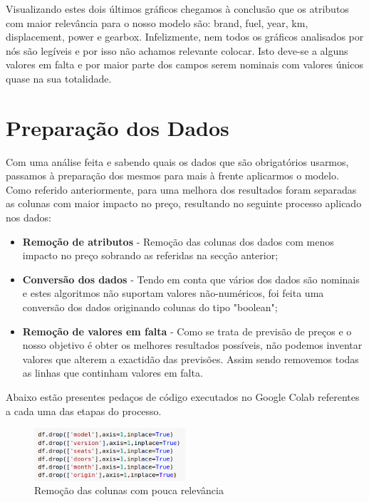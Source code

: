 \documentclass[a4paper]{report}
\begin{document}
Visualizando estes dois últimos gráficos chegamos à conclusão que os atributos com maior 
relevância para o nosso modelo são: brand, fuel, year, km, displacement, power e gearbox.
Infelizmente, nem todos os gráficos analisados por nós são legíveis
e por isso não achamos relevante colocar. Isto deve-se a alguns valores em falta e por
maior parte dos campos serem nominais com valores únicos quase na sua totalidade.

\section{Preparação dos Dados}

Com uma análise feita e sabendo quais os dados que são obrigatórios usarmos, passamos à 
preparação dos mesmos para mais à frente aplicarmos o modelo.
Como referido anteriormente, para uma melhora dos resultados foram separadas as colunas com
maior impacto no preço, resultando no seguinte processo aplicado nos dados:
\begin{itemize}
    \item \textbf{Remoção de atributos} - Remoção das colunas dos dados com menos impacto no
    preço sobrando as referidas na secção anterior;
    \item \textbf{Conversão dos dados} - Tendo em conta que vários dos dados são nominais e 
    estes algoritmos não suportam valores não-numéricos, foi feita uma conversão dos dados 
    originando colunas do tipo "boolean";
    \item \textbf{Remoção de valores em falta} - Como se trata de previsão de preços e o
    nosso objetivo é obter os melhores resultados possíveis, não podemos inventar valores 
    que alterem a exactidão das previsões. Assim sendo removemos todas as linhas que 
    continham valores em falta.
\end{itemize}

Abaixo estão presentes pedaços de código executados no Google Colab referentes 
a cada uma das etapas do processo.

\begin{figure}[H]
    \centering
    \includegraphics[width=0.5\textwidth]{images/drop_values.png}
    \caption{Remoção das colunas com pouca relevância}
\end{figure}
\end{document}
